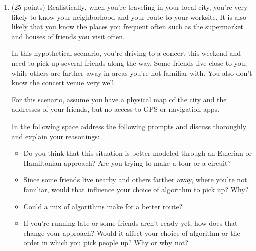 \documentclass[12pt]{exam}
\begin{document}
\begin{enumerate}
\iffalse
Sol:
\begin{enumerate}
    \item A walk starts and ends at different places whereas a circuit begins and ends at the same place.
    \item Eulerian means that edges are the object of interest to traverse, while Hamiltonian means that the vertices are the traversed ones.
    \item Any path graph.
    \item A path graph with any pair of middle vertices connected.
    \item Two triangles joined at a vertex, say a ribbon.
    \item The ribbon graph again.
    \item A cycle with more than four vertices with any two non-adjacent vertices connected.
\end{enumerate}
\fi
\newpage
\item (25 points) Realistically, when you're traveling in your local city, you're very likely to know your neighborhood and your route to your worksite. It is also likely that you know the places you frequent often such as the supermarket and houses of friends you visit often.\par
In this hypothetical scenario, you're driving to a concert this weekend and need to pick up several friends along the way. Some friends live close to you, while others are farther away in areas you're not familiar with. You also don't know the concert venue very well.\par
For this scenario, assume you have a physical map of the city and the addresses of your friends, but no access to GPS or navigation apps.\par
In the following space address the following prompts and discuss thoroughly and explain your reasonings:
\begin{itemize}
    \item Do you think that this situation is better modeled through an Eulerian or Hamiltonian approach? Are you trying to make a tour or a circuit? 
    \item Since some friends live nearby and others farther away, where you're not familiar, would that influence your choice of algorithm to pick up? Why?
    \item Could a mix of algorithms make for a better route?
    \item If you're running late or some friends aren't ready yet, how does that change your approach? Would it affect your choice of algorithm or the order in which you pick people up? Why or why not?
\end{itemize}


\end{enumerate}
\end{document}

